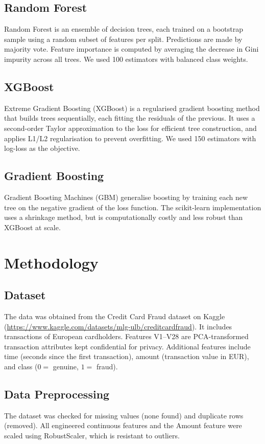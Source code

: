 \documentclass[conference]{IEEEtran}
\begin{document}
\subsection{Random Forest}
Random Forest is an ensemble of decision trees, each trained on a bootstrap sample using a random subset of features per split. Predictions are made by majority vote. Feature importance is computed by averaging the decrease in Gini impurity across all trees. We used 100 estimators with balanced class weights.

\subsection{XGBoost}
Extreme Gradient Boosting (XGBoost) is a regularised gradient boosting method that builds trees sequentially, each fitting the residuals of the previous. It uses a second-order Taylor approximation to the loss for efficient tree construction, and applies L1/L2 regularisation to prevent overfitting. We used 150 estimators with log-loss as the objective.

\subsection{Gradient Boosting}
Gradient Boosting Machines (GBM) generalise boosting by training each new tree on the negative gradient of the loss function. The scikit-learn implementation uses a shrinkage method, but is computationally costly and less robust than XGBoost at scale.

\section{Methodology}

\subsection{Dataset}
The data was obtained from the Credit Card Fraud dataset on Kaggle (\url{https://www.kaggle.com/datasets/mlg-ulb/creditcardfraud}). It includes transactions of European cardholders. Features V1--V28 are PCA-transformed transaction attributes kept confidential for privacy. Additional features include time (seconds since the first transaction), amount (transaction value in EUR), and class ($0 =$ genuine, $1 =$ fraud).

\subsection{Data Preprocessing}
The dataset was checked for missing values (none found) and duplicate rows (removed). All engineered continuous features and the Amount feature were scaled using RobustScaler, which is resistant to outliers.
\end{document}
